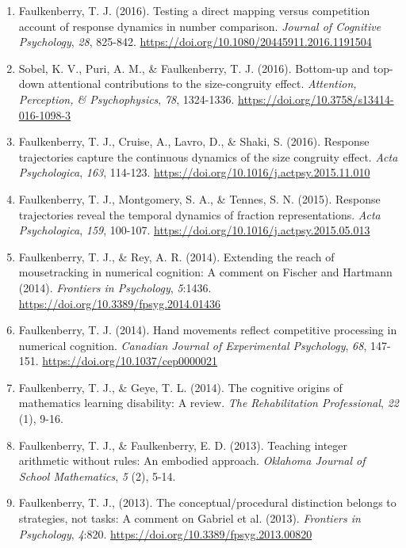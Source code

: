 \documentclass[article,10pt]{article}
\begin{document}
\begin{enumerate}
\item Faulkenberry, T. J. (2016). Testing a direct mapping versus competition account of response dynamics in number comparison. \emph{Journal of Cognitive Psychology}, \emph{28}, 825-842. \url{https://doi.org/}\href{http://dx.doi.org/10.1080/20445911.2016.1191504}{10.1080/20445911.2016.1191504}
\item Sobel, K. V., Puri, A. M., \& Faulkenberry, T. J. (2016). Bottom-up and top-down attentional contributions to the size-congruity effect. \emph{Attention, Perception, \& Psychophysics}, \emph{78}, 1324-1336. \url{https://doi.org/}\href{http://dx.doi.org/10.3758/s13414-016-1098-3}{10.3758/s13414-016-1098-3}
\item Faulkenberry, T. J., Cruise, A., Lavro, D., \& Shaki, S. (2016). Response trajectories capture the continuous dynamics of the size congruity effect. \emph{Acta Psychologica}, \emph{163}, 114-123. \url{https://doi.org/}\href{http://dx.doi.org/10.1016/j.actpsy.2015.11.010}{10.1016/j.actpsy.2015.11.010}
\item Faulkenberry, T. J., Montgomery, S. A., \& Tennes, S. N. (2015). Response trajectories reveal the temporal dynamics of fraction representations. \emph{Acta Psychologica}, \emph{159}, 100-107. \url{https://doi.org/}\href{http://dx.doi.org/10.1016/j.actpsy.2015.05.013}{10.1016/j.actpsy.2015.05.013}
\item Faulkenberry, T. J., \& Rey, A. R. (2014). Extending the reach of mousetracking in numerical cognition: A comment on Fischer and Hartmann (2014). \emph{Frontiers in Psychology}, \emph{5}:1436. \url{https://doi.org/}\href{http://dx.doi.org/10.3389/fpsyg.2014.01436}{10.3389/fpsyg.2014.01436}
\item Faulkenberry, T. J. (2014). Hand movements reflect competitive processing in numerical cognition. \emph{Canadian Journal of Experimental Psychology}, \emph{68}, 147-151. \url{https://doi.org/}\href{http://dx.doi.org/10.1037/cep0000021}{10.1037/cep0000021}
\item Faulkenberry, T. J., \& Geye, T. L. (2014). The cognitive origins of mathematics learning disability: A review. \emph{The Rehabilitation Professional}, \emph{22} (1), 9-16.
\item Faulkenberry, T. J., \& Faulkenberry, E. D. (2013). Teaching integer arithmetic without rules: An embodied approach. \emph{Oklahoma Journal of School Mathematics}, \emph{5} (2), 5-14.
\item Faulkenberry, T. J., (2013). The conceptual/procedural distinction belongs to strategies, not tasks: A comment on Gabriel et al. (2013). \emph{Frontiers in Psychology}, \emph{4}:820. \url{https://doi.org/}\href{http://dx.doi.org/10.3389/fpsyg.2013.00820}{10.3389/fpsyg.2013.00820}

\end{enumerate}
\end{document}
